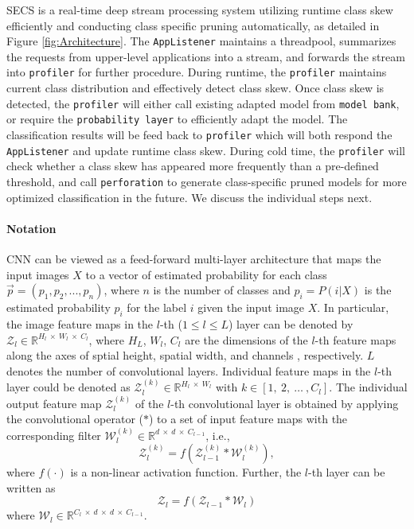 \documentclass[pageno]{jpaper}
\begin{document}
SECS is a real-time deep stream processing system utilizing runtime class skew efficiently and conducting class specific pruning automatically, as detailed in Figure \ref{fig:Architecture}. The \texttt{AppListener} maintains a threadpool, summarizes the requests from upper-level applications into a stream, and forwards the stream into \texttt{profiler} for further procedure. During runtime, the \texttt{profiler} maintains current class distribution and effectively detect class skew. Once class skew is detected, the \texttt{profiler} will either call existing adapted model from \texttt{model bank}, or require the \texttt{probability layer} to efficiently adapt the model. The classification results will be feed back to \texttt{profiler} which will both respond the \texttt{AppListener} and update runtime class skew. During cold time, the \texttt{profiler} will check whether a class skew has appeared more frequently than a pre-defined threshold, and call \texttt{perforation} to generate class-specific pruned models for more optimized classification in the future. We discuss the individual steps next.






\paragraph{Notation}
CNN can be viewed as a feed-forward multi-layer architecture that maps the input images $X$ to a vector of estimated probability for each class $\vec{p} = (p_1, p_2, ..., p_n)$, where $n$ is the number of classes and $p_i = P(i|X)$ is the estimated probability $p_i$ for the label $i$ given the input image $X$. In particular, the image feature maps in the $l$-th ($1 \leqslant l \leqslant L$) layer can be denoted by $\mathcal{Z}_l \in \mathbb{R}^{H_l \: \times \: W_l \: \times \: C_l}$, where $H_L$, $W_l$, $C_l$ are the dimensions of the $l$-th feature maps along the axes of sptial height, spatial width, and channels , respectively. $L$ denotes the number of convolutional layers. Individual feature maps in the $l$-th layer could be denoted as $\mathcal{Z}_l^{(k)} \in \mathbb{R}^{H_l \: \times \: W_l}$ with $k \in [1, \:2, \: \dots \:, C_l]$. The individual output feature map $\mathcal{Z}_l^{(k)}$ of the $l$-th convolutional layer is obtained by applying the convolutional operator ($\ast$) to a set of input feature maps with the corresponding filter $\mathcal{W}_l^{(k)} \in \mathbb{R}^{d \: \times \: d \: \times \: C_{l-1}}$, i.e.,
\begin{equation}
    \mathcal{Z}_l^{(k)} = f(\mathcal{Z}_{l-1}^{(k)} \ast \mathcal{W}_l^{(k)}),
\end{equation}
where $f(\cdot)$ is a non-linear activation function. Further, the $l$-th layer can be written as
\begin{equation} \label{eq:1}
    \mathcal{Z}_l = f(\mathcal{Z}_{l-1} \ast \mathcal{W}_l)
\end{equation}
where $\mathcal{W}_l \in \mathbb{R}^{C_l \: \times \:   d \: \times \: d \: \times \: C_{l-1}}$.
\end{document}
